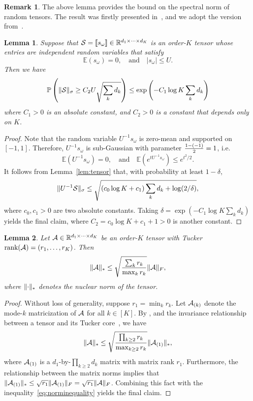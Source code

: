 \documentclass[11pt]{article}
\theoremstyle{plain}
\newtheorem{lem}{Lemma}
\theoremstyle{definition}
\newtheorem{rmk}{Remark}
\begin{document}
\begin{rmk}
The above lemma provides the bound on the spectral norm of random tensors. The result was firstly presented in~\cite{nguyen2015tensor}, and we adopt the version from~\cite{tomioka2014spectral}.  
\end{rmk}

\begin{lem} \label{lem:noisytensor}
Suppose that $\mathcal{S}=\llbracket s_{\omega} \rrbracket\in\mathbb{R}^{d_1\times \cdots \times d_K}$ is an order-$K$ tensor whose entries are independent random variables that satisfy
\[
\mathbb{E}(s_{\omega})=0,\quad \text{and}\quad |s_{\omega}|\leq U.
\]
Then we have
\[
\mathbb{P}\left(\lVert\mathcal{S}\rVert_\sigma\geq C_2 U\sqrt{\sum_k d_k} \right)\leq \exp\left(-C_1  \log K \sum_k d_k\right)
\]
where $C_1>0$ is an absolute constant, and $C_2>0$ is a constant that depends only on $K$. 
\end{lem}

\begin{proof}  Note that the random variable $U^{-1}s_{\omega}$ is zero-mean and supported on $[-1,1]$. Therefore, $U^{-1}s_{\omega}$ is sub-Gaussian with parameter ${1-(-1)\over 2}=1$, i.e.
\[
\mathbb{E}(U^{-1}s_{\omega})=0,\quad \text{and}\quad \mathbb{E}(e^{tU^{-1}s_{\omega}})\leq e^{t^2/2}.
\]
It follows from Lemma~\ref{lem:tensor} that, with probability at least $1-\delta$, 
\[
\lVert U^{-1}\mathcal{S}\rVert_\sigma\leq \sqrt{\left(c_0\log K+c_1\right) \sum_k d_k +\log (2/\delta)},
\]
where $c_0, c_1>0$ are two absolute constants. Taking $\delta=\exp (-C_1\log K \sum_k d_k)$ yields the final claim, where $C_2=c_0\log K+c_1+1>0$ is another constant.  
\end{proof}



\begin{lem} \label{lem:nuclear}
Let $\mathcal{A}\in\mathbb{R}^{d_1\times\cdots\times d_K}$ be an order-$K$ tensor with Tucker $\text{rank}(\mathcal{A})=(r_1,\ldots,r_K)$. Then
\[
\lVert\mathcal{A}\rVert_* \leq \sqrt{\sum_k r_k\over \max_k r_k} \lVert\mathcal{A}\rVert_F,
\]
where $\lVert\cdot\rVert_*$ denotes the nuclear norm of the tensor. 
\end{lem}

\begin{proof}
Without loss of generality, suppose $r_1=\min_k r_k$. Let $\mathcal{A}_{(k)}$ denote the mode-$k$ matricization of $\mathcal{A}$ for all $k\in[K]$. By \citet[Corollary 4.11]{wang2017operator}, and the invariance relationship between a tensor and its Tucker core~\citep[Section 6]{jiang2017tensor}, we have
\begin{equation}\label{eq:norminequality}
\lVert\mathcal{A}\rVert_* \leq \sqrt{\prod_{k\geq 2} r_k \over \max_{k\geq 2} r_k} \lVert\mathcal{A}_{(1)}\rVert_*,
\end{equation}
where $\mathcal{A}_{(1)}$ is a $d_1$-by-$\prod_{k\geq 2}d_k$ matrix with matrix rank $r_1$. Furthermore, the relationship between the matrix norms implies that $\lVert\mathcal{A}_{(1)}\rVert_*\leq \sqrt{r_1}\lVert\mathcal{A}_{(1)}\rVert_F=\sqrt{r_1}\lVert\mathcal{A}\rVert_F$. Combining this fact with the inequality~\eqref{eq:norminequality} yields the final claim. 
\end{proof}
\end{document}
